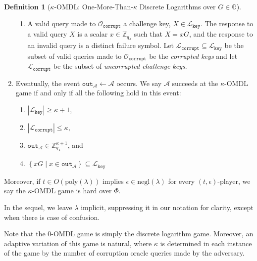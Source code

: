 \documentclass[11pt]{article}
\theoremstyle{definition}
\newtheorem{definition}[definition]{Definition}
\newcommand{\G}{\mathbb{G}}
\newcommand{\Zq}{\mathbb{Z}_q}
\newcommand{\secpar}{\lambda}
\newcommand{\polysecpar}{O(\text{poly}(\secpar))}
\newcommand{\negl}{\text{negl}(\secpar)}
\newcommand{\corruptionOracle}{\mathcal{O}_{\texttt{corrupt}}}
\newcommand{\keyOracle}{\mathcal{O}_{\texttt{key}}}
\newcommand{\challengeKeySet}{\mathcal{L}_{\texttt{key}}}
\newcommand{\corruptedKeySet}{\mathcal{L}_{\texttt{corrupt}}}
\newcommand{\free}[1]{{\textcolor{Red}{#1}}}
\begin{document}
\begin{definition}[$\kappa$-OMDL: One-More-Than-$\kappa$ Discrete Logarithms over $G \in \G$]
\begin{enumerate}
\begin{enumerate}
\item A valid query made to $\corruptionOracle$ a challenge key, $X \in \challengeKeySet$. The response to a valid query $X$ is a scalar $x \in \mathbb{Z}_{q_\secpar}$ such that $X = xG$, and the response to an invalid query is a distinct failure symbol. Let $\corruptedKeySet \subseteq \challengeKeySet$ be the subset of valid queries made to $\corruptionOracle$ be the \textit{corrupted keys} and let $\overline{\corruptedKeySet}$ be the subset of \textit{uncorrupted challenge keys}.
\end{enumerate}
   \item Eventually, the event $\texttt{out}_\mathcal{A} \leftarrow \mathcal{A}$ occurs. We say $\mathcal{A}$ succeeds at the $\kappa$-OMDL game if and only if all the following hold in this event:
\begin{enumerate}
\item $\left|\challengeKeySet\right| \geq \kappa + 1$,
\item $\left|\corruptedKeySet\right| \leq \kappa$,
\item $\texttt{out}_{\mathcal{A}} \in \mathbb{Z}_{q_\secpar}^{\kappa+1}$, and
\item $\left\{xG \mid x \in \texttt{out}_{\mathcal{A}}\right\} \subseteq \challengeKeySet$
\end{enumerate}
\end{enumerate}
Moreover, if $t \in \polysecpar$ implies $\epsilon \in \negl$ for every $(t, \epsilon)$-player, we say the $\kappa$-OMDL game is hard over $\Phi$.
\end{definition}

In the sequel, we leave $\secpar$ implicit, suppressing it in our notation for clarity, except when there is case of confusion.

Note that the $0$-OMDL game is simply the discrete logarithm game. Moreover, an adaptive variation of this game is natural, where  $\kappa$ is determined in each instance of the game by the number of corruption oracle queries made by the adversary.
\end{document}
